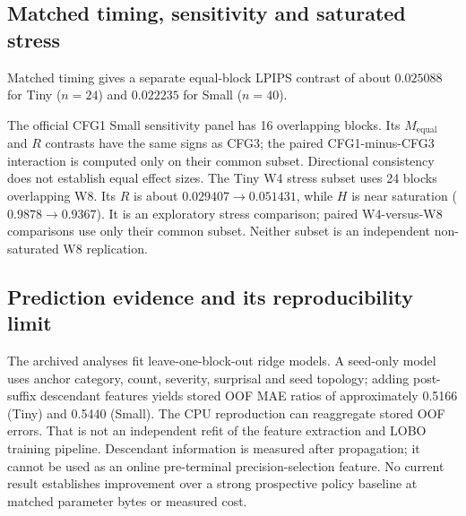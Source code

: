 \documentclass[11pt,a4paper]{article}
\theoremstyle{plain}
\theoremstyle{definition}
\theoremstyle{remark}
\newcommand{\Meq}{M_{\mathrm{equal}}}
\newcommand{\revisiongenerated}{../../generated/v1.0.1}
\begin{document}
\subsection{Matched timing, sensitivity and saturated stress}
\label{sec:auxiliary}
Matched timing gives a separate equal-block LPIPS contrast of about $0.025088$
for Tiny ($n=24$) and $0.022235$ for Small ($n=40$).
\begin{table}[tb]
\centering\small
\setlength{\tabcolsep}{3pt}
\caption{Matched-timing score contrasts are separate from natural-shock $R$.
Tiny has 24 paired blocks, Small 40; each has two conditional replicates.}
\label{tab:matched}

\end{table}
The official CFG1 Small sensitivity panel has 16 overlapping blocks. Its
$\Meq$ and $R$ contrasts have the same signs as CFG3; the paired CFG1-minus-CFG3
interaction is computed only on their common subset. Directional consistency
does not establish equal effect sizes. The Tiny W4 stress subset uses 24
blocks overlapping W8. Its $R$ is about $0.029407\rightarrow0.051431$,
while $H$ is near saturation ($0.9878\rightarrow0.9367$). It is an exploratory
stress comparison; paired W4-versus-W8 comparisons use only their common subset.
Neither subset is an independent non-saturated W8 replication.
\begin{table}[tb]
\centering\small\setlength{\tabcolsep}{3pt}
\caption{Exploratory paired differences in $\Delta=.5-.3$, restricted to common
within-checkpoint blocks. Same direction does not imply equal effect size.}
\label{tab:interactions}

\end{table}


\subsection{Prediction evidence and its reproducibility limit}
\label{sec:prediction}
The archived analyses fit leave-one-block-out ridge models. A seed-only model
uses anchor category, count, severity, surprisal and seed topology; adding
post-suffix descendant features yields stored OOF MAE ratios of approximately
0.5166 (Tiny) and 0.5440 (Small). The CPU reproduction can reaggregate stored
OOF errors. That is not an independent refit of the feature extraction and LOBO
training pipeline. Descendant information is measured after propagation;
it cannot be used as an online pre-terminal precision-selection feature.
No current result establishes improvement over a strong prospective policy
baseline at matched parameter bytes or measured cost.
\end{document}
